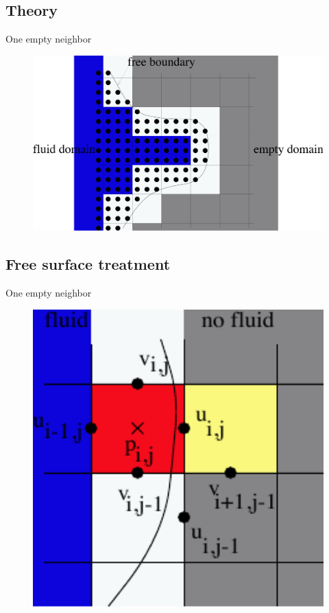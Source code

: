 \documentclass{beamer}
\begin{document}
\subsection{Theory}
	\begin{frame}{One empty neighbor}
		\begin{figure}
			\includegraphics[width=1\textwidth]{pic/all.pdf}
		\end{figure}
	\end{frame}	

\subsection{Free surface treatment}
	\begin{frame}{One empty neighbor}
		\begin{figure}
			\includegraphics[width=1\textwidth]{pic/one.pdf}
		\end{figure}			
		
	\end{frame}	
	
\end{document}

